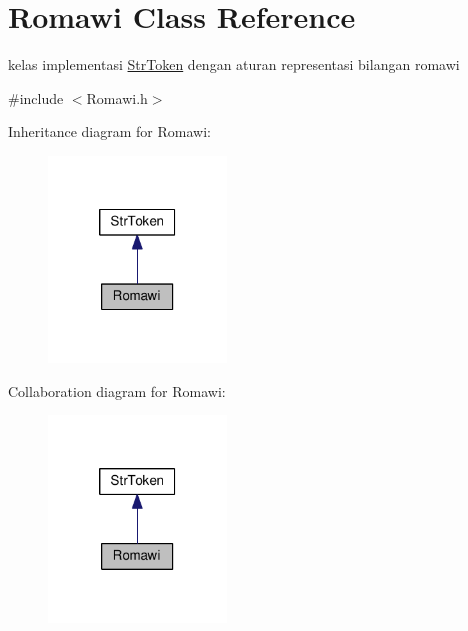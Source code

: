 \hypertarget{class_romawi}{\section{Romawi Class Reference}
\label{class_romawi}
}


kelas implementasi \hyperlink{class_str_token}{Str\-Token} dengan aturan representasi bilangan romawi  




{\ttfamily \#include $<$Romawi.\-h$>$}



Inheritance diagram for Romawi\-:\nopagebreak
\begin{figure}[H]
\begin{center}
\leavevmode
\includegraphics[width=134pt]{class_romawi__inherit__graph}
\end{center}
\end{figure}


Collaboration diagram for Romawi\-:\nopagebreak
\begin{figure}[H]
\begin{center}
\leavevmode
\includegraphics[width=134pt]{class_romawi__coll__graph}
\end{center}
\end{figure}
